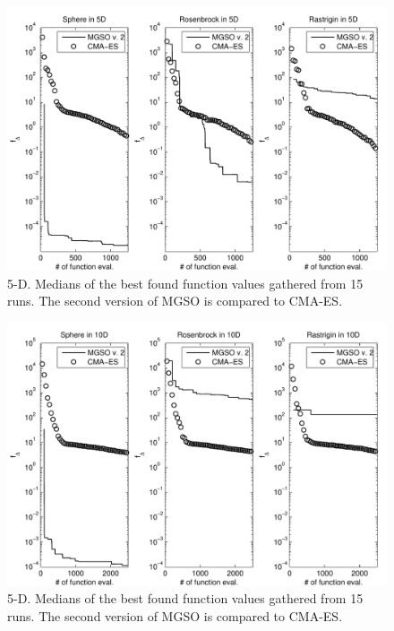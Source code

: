 \documentclass{itatnew}
\begin{document}
\begin{figure}
  \centering
  \includegraphics[width=\linewidth]{optim_5D}
  {\small
    \caption{5-D. Medians of the best found function values gathered from 15 runs. The second version of MGSO is compared to CMA-ES.
  \label{fig:optim_5D}
  }
  }
\end{figure}


\begin{figure}
  \centering
  \includegraphics[width=\linewidth]{optim_10D}
  {\small
    \caption{5-D. Medians of the best found function values gathered from 15 runs. The second version of MGSO is compared to CMA-ES.
  \label{fig:optim_10D}
  }
  }
\end{figure}
\end{document}
